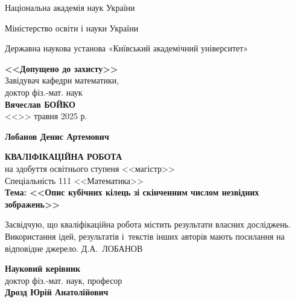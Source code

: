 \documentclass{thesis}
\begin{document}
\allowdisplaybreaks

\large

\setcounter{page}{1}
\thispagestyle{empty}
\centerline{Національна академія наук України}
\centerline{Міністерство освіти і науки України}
\centerline{Державна наукова установа «Київський академічний університет»}

\vspace{10mm}

\begin{flushright}
\begin{minipage}{100mm}
\begin{center}\large {\bf <<Допущено до захисту>>}\\
Завідувач кафедри математики,\\
доктор фіз.-мат. наук\\
{\bf Вячеслав БОЙКО}\\
<<\underline{\hspace{8mm}}>> травня 2025 р.
\end{center}
\end{minipage}
\end{flushright}

\vspace{10mm}

\centerline{\Large \bf Лобанов Денис Артемович}

\begin{center}
{\bf КВАЛІФІКАЦІЙНА РОБОТА}\\
на здобуття освітнього ступеня <<магістр>>\\
Спеціальність 111 <<Математика>>\\[4mm]
{\Large \bf Тема: <<Опис кубічних кілець зі скінченним числом незвідних зображень>>}
\end{center}


\vspace{5mm}

\noindent
{Засвідчую, що кваліфікаційна робота містить результати власних досліджень. Використання ідей, результатів і~текстів інших авторів мають посилання на відповідне джерело.
\underline{\hspace{18mm}} Д.А.~ЛОБАНОВ\par}

\vspace{5mm}

\begin{flushright}
\begin{minipage}{90mm}
\large {\bf Науковий керівник}\\
доктор фіз.-мат. наук, професор\\
{\bf Дрозд Юрій Анатолійович}\\
\underline{\hspace{48mm}}

\end{minipage}
\end{flushright}
\end{document}
